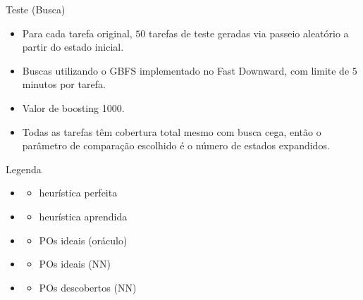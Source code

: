 \documentclass{beamer}
\begin{document}
\begin{frame}{Teste (Busca)}
\begin{itemize}
  \item Para cada tarefa original, \alert{$50$ tarefas de teste} geradas via passeio aleatório a partir do estado inicial.
  \pause
  \item Buscas utilizando o GBFS implementado no Fast Downward, com limite de \alert{$5$ minutos} por tarefa.
  \pause
  \item Valor de \alert{boosting 1000}.
  \pause
  \item Todas as tarefas têm cobertura total mesmo com busca cega, então o parâmetro de comparação escolhido é o \alert{número de estados expandidos}.
\end{itemize}
\end{frame}

\begin{frame}{Legenda}
\begin{multicols}{3}
\begin{itemize}
  \item \hstar
    \begin{itemize}
      \item heurística perfeita
    \end{itemize}
  \item \hnn
    \begin{itemize}
      \item heurística aprendida
    \end{itemize}
  \item \postartable
    \begin{itemize}
      \item POs ideais (oráculo)
    \end{itemize}
  \item \postar
    \begin{itemize}
      \item POs ideais (NN)
    \end{itemize}
  \item \alert{\pog}
    \begin{itemize}
      \item POs descobertos (NN)
    \end{itemize}

\end{itemize}
\end{multicols}
\end{frame}
\end{document}
